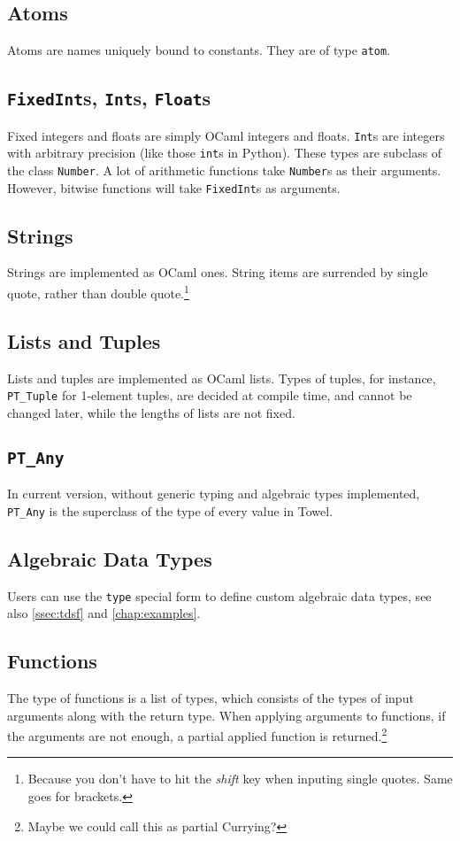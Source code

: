 \documentclass{book}
\begin{document}
\subsection{Atoms}
Atoms are names uniquely bound to constants. They are of type \texttt{atom}.


\subsection{\texttt{FixedInt}s, \texttt{Int}s, \texttt{Float}s}
Fixed integers and floats are simply OCaml integers and floats. \texttt{Int}s are integers with arbitrary precision (like those \texttt{int}s in Python). These types are subclass of the class \texttt{Number}. A lot of arithmetic functions take \texttt{Number}s as their arguments. However, bitwise functions will take \texttt{FixedInt}s as arguments.

\subsection{Strings}
Strings are implemented as OCaml ones. String items are surrended by single quote, rather than double quote.\footnote{Because you don't have to hit the \textit{shift} key when inputing single quotes. Same goes for brackets.}

\subsection{Lists and Tuples}
Lists and tuples are implemented as OCaml lists. Types of tuples, for instance, \texttt{PT\_Tuple} for 1-element tuples, are decided at compile time, and cannot be changed later, while the lengths of lists are not fixed.

\subsection{\texttt{PT\_Any}}
In current version, without generic typing and algebraic types implemented, \texttt{PT\_Any} is the superclass of the type of every value in Towel.

\subsection{Algebraic Data Types}
Users can use the \texttt{type} special form to define custom algebraic data types, see also \autoref{ssec:tdsf} and \autoref{chap:examples}.

\subsection{Functions}
The type of functions is a list of types, which consists of the types of input arguments along with the return type. When applying arguments to functions, if the arguments are not enough, a partial applied function is returned.\footnote{Maybe we could call this as partial Currying?}
\end{document}
